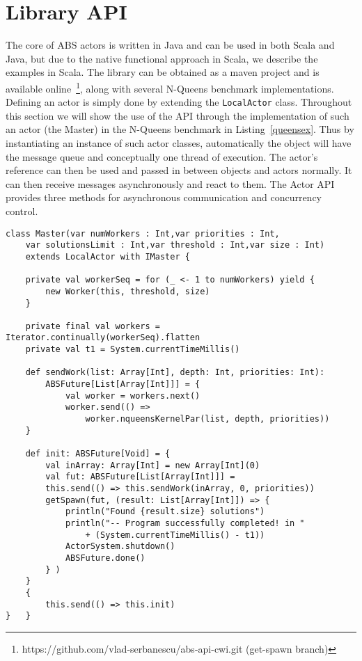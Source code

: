 \section{Library API}
\label{scalaapi}

\newcommand{\future}{\lstinline{ABSFuture}}
\newcommand{\send}{\lstinline{send}}
\newcommand{\spawn}{\lstinline{spawn}}
\newcommand{\gspawn}{\lstinline{getSpawn}}

The core of ABS actors is written in Java and can be used in both Scala and Java, but due to the native functional approach in Scala, we describe the examples in Scala. The library can be obtained as a maven project and is available online~\footnote{https://github.com/vlad-serbanescu/abs-api-cwi.git (get-spawn branch)}, along with several N-Queens benchmark implementations.
Defining an actor is simply done by extending the \lstinline{LocalActor} class. Throughout this section we will show the use of the API through the implementation of such an actor (the Master) in the N-Queens benchmark in Listing~\ref{queensex}. Thus by instantiating an instance of such actor classes, automatically the object will have the message queue and conceptually one thread of execution. The actor's reference can then be used and passed in between objects and actors normally. It can then receive messages asynchronously and react to them.  
The Actor API provides three methods for asynchronous communication and concurrency control.

\begin{lstlisting}[caption= Master Actor Class, label=queensex]
class Master(var numWorkers : Int,var priorities : Int,
	var solutionsLimit : Int,var threshold : Int,var size : Int) 
	extends LocalActor with IMaster {
	
	private val workerSeq = for (_ <- 1 to numWorkers) yield {
		new Worker(this, threshold, size)
	}
	
	private final val workers = Iterator.continually(workerSeq).flatten
	private val t1 = System.currentTimeMillis()
	
	def sendWork(list: Array[Int], depth: Int, priorities: Int): 
		ABSFuture[List[Array[Int]]] = {
			val worker = workers.next()
			worker.send(() => 
				worker.nqueensKernelPar(list, depth, priorities))
	}
	
	def init: ABSFuture[Void] = {
		val inArray: Array[Int] = new Array[Int](0)
		val fut: ABSFuture[List[Array[Int]]] = 
		this.send(() => this.sendWork(inArray, 0, priorities))
		getSpawn(fut, (result: List[Array[Int]]) => {
			println("Found {result.size} solutions")
			println("-- Program successfully completed! in " 
				+ (System.currentTimeMillis() - t1))
			ActorSystem.shutdown()
			ABSFuture.done()
		} )
	}	
	{
		this.send(() => this.init)
}	}
\end{lstlisting}


